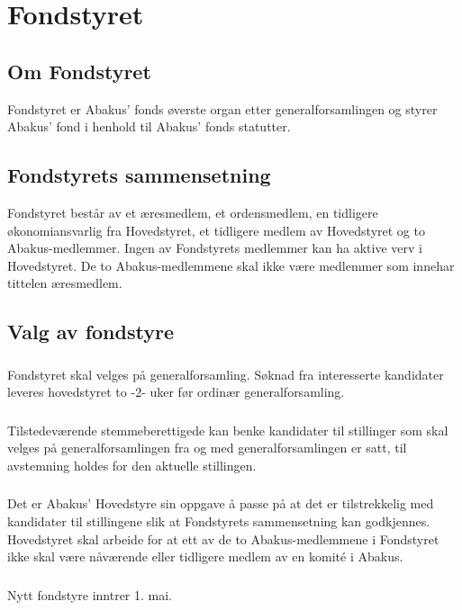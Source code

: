 \section{Fondstyret}
\subsection{Om Fondstyret}
Fondstyret er Abakus’ fonds øverste organ etter generalforsamlingen og styrer
Abakus’ fond i henhold til Abakus’ fonds statutter.

\subsection{Fondstyrets sammensetning}
Fondstyret består av et æresmedlem, et ordensmedlem, en tidligere økonomiansvarlig fra
Hovedstyret, et tidligere medlem av Hovedstyret og to Abakus-medlemmer.
Ingen av Fondstyrets medlemmer kan ha aktive verv i Hovedstyret. De to Abakus-medlemmene
skal ikke være medlemmer som innehar tittelen æresmedlem.

\subsection{Valg av fondstyre}
\subsubsection{}
Fondstyret skal velges på generalforsamling. Søknad fra interesserte kandidater
leveres hovedstyret to -2- uker før ordinær generalforsamling.

\subsubsection{}
Tilstedeværende stemmeberettigede kan benke kandidater til stillinger som skal velges
på generalforsamlingen fra og med generalforsamlingen er satt, til avstemning holdes for
den aktuelle stillingen.

\subsubsection{}
Det er Abakus’ Hovedstyre sin oppgave å passe på at det er tilstrekkelig med kandidater til
stillingene slik at Fondstyrets sammensetning kan godkjennes. Hovedstyret skal arbeide for
at ett av de to Abakus-medlemmene i Fondstyret ikke skal være nåværende eller tidligere
medlem av en komité i Abakus.

\subsubsection{}
Nytt fondstyre inntrer 1. mai.

